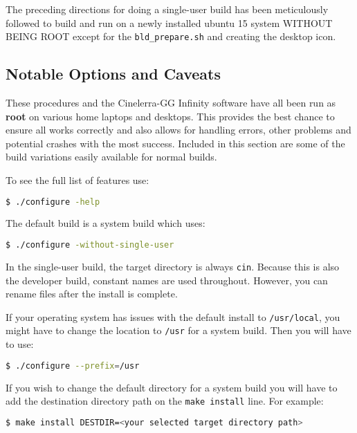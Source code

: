 The preceding directions for doing a single-user build has been meticulously followed to build and run
on a newly installed ubuntu 15 system WITHOUT BEING ROOT except for the \texttt{bld\_prepare.sh} and creating the desktop icon.

\subsection{Notable Options and Caveats}%
\label{sub:notable_options_and_caveats}

These procedures and the Cinelerra-GG Infinity software have all been run as \textbf{root} on various home laptops and desktops. This provides the best chance to ensure all works correctly and also allows for handling errors, other problems and potential crashes with the most success.  Included in this section are some of the build variations easily available for normal builds.

To see the full list of features use:	 

\begin{lstlisting}[language=bash,numbers=none]
$ ./configure -help
\end{lstlisting}
The default build is a system build which uses:    

\begin{lstlisting}[language=bash,numbers=none]
$ ./configure -without-single-user
\end{lstlisting}

In the single-user build, the target directory is always \texttt{cin}.  
Because this is also the developer build, constant names are used throughout.  
However, you can rename files after the install is complete.

If your operating system has issues with the default install to \texttt{/usr/local}, you might have to change the location to \texttt{/usr} for a system build.  Then you will have to use:
\begin{lstlisting}[language=bash,numbers=none]
$ ./configure --prefix=/usr
\end{lstlisting}

If you wish to change the default directory for a system build you will have to add the destination directory path on the \texttt{make install} line.  For example:
\begin{lstlisting}[language=bash,numbers=none]
$ make install DESTDIR=<your selected target directory path>
\end{lstlisting}

